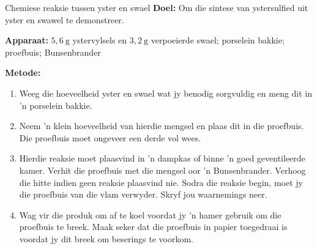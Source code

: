             \begin{g_experiment}{Chemiese reaksie tussen yster en swael}
            \nopagebreak
            \label{m38709*id63437}\noindent{}\textbf{Doel:}
          \newline
Om die sintese van ystersulfied uit yster en swawel te demonstreer.\par
        \label{m38709*id63447}\noindent{}\textbf{Apparaat:}
          \newline
$5,6~\text{g}$ ystervylsels en $3,2~\text{g}$ verpoeierde swael; porselein bakkie; proefbuis; Bunsenbrander\par 
        \label{m38709*id63457}
    \begin{center}
    \end{center}
        \par 
        \label{m38709*id63467}\noindent{}\textbf{Metode:}
          \newline
        \label{m38709*id63473}\begin{enumerate}[noitemsep, label=\textbf{\arabic*}. ] 
            \label{m38709*uid20}\item Weeg die hoeveelheid yster en swael wat jy benodig sorgvuldig en meng dit in 'n porselein bakkie.
\label{m38709*uid21}\item Neem 'n klein hoeveelheid van hierdie mengsel en plaas dit in die proefbuis. Die proefbuis moet ongeveer een derde vol wees.
\label{m38709*uid22}\item Hierdie reaksie moet plaasvind in 'n dampkas of binne 'n goed geventileerde kamer. Verhit die proefbuis met die mengsel oor  'n Bunsenbrander. Verhoog die hitte indien geen reaksie plaasvind nie. Sodra die reaksie begin, moet jy die proefbuis van die vlam verwyder. Skryf jou waarnemings neer.
\label{m38709*uid23}\item Wag vir die produk om af te koel voordat jy  'n hamer gebruik om die proefbuis te breek. Maak seker dat die proefbuis in papier toegedraai is voordat jy dit breek om beserings te voorkom.

\end{enumerate}
\end{g_experiment}

